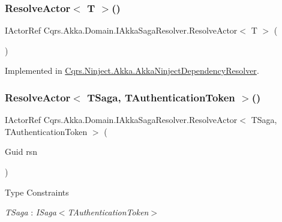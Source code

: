 \subsubsection{\texorpdfstring{Resolve\+Actor$<$ T $>$()}{ResolveActor< T >()}}
{\footnotesize\ttfamily I\+Actor\+Ref Cqrs.\+Akka.\+Domain.\+I\+Akka\+Saga\+Resolver.\+Resolve\+Actor$<$ T $>$ (\begin{DoxyParamCaption}{ }\end{DoxyParamCaption})}



Implemented in \hyperlink{classCqrs_1_1Ninject_1_1Akka_1_1AkkaNinjectDependencyResolver_a6c3399c949a77457456d77688eb66054_a6c3399c949a77457456d77688eb66054}{Cqrs.\+Ninject.\+Akka.\+Akka\+Ninject\+Dependency\+Resolver}.

\mbox{\label{interfaceCqrs_1_1Akka_1_1Domain_1_1IAkkaSagaResolver_ab41671bdbd0d7d83552b5e11e47fe36d_ab41671bdbd0d7d83552b5e11e47fe36d}} 
\subsubsection{\texorpdfstring{Resolve\+Actor$<$ T\+Saga, T\+Authentication\+Token $>$()}{ResolveActor< TSaga, TAuthenticationToken >()}}
{\footnotesize\ttfamily I\+Actor\+Ref Cqrs.\+Akka.\+Domain.\+I\+Akka\+Saga\+Resolver.\+Resolve\+Actor$<$ T\+Saga, T\+Authentication\+Token $>$ (\begin{DoxyParamCaption}\item[{Guid}]{rsn }\end{DoxyParamCaption})}

\begin{Desc}
\item[Type Constraints]\begin{description}
\item[{\em T\+Saga} : {\em I\+Saga$<$T\+Authentication\+Token$>$}]\end{description}
\end{Desc}
